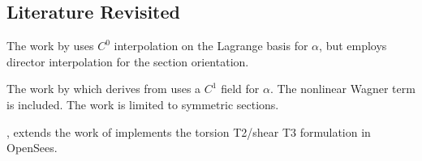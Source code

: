 \subsection{Literature Revisited}

The work by \cite{gruttmann2000theory} uses \(C^0\) interpolation on the Lagrange basis for \(\alpha\), but employs director interpolation for the section orientation.

\cite{hsiao1999consistent,hsiao2000corotational}

The work by \cite{zhang2011formulation} which derives from \cite{alemdar2001distributed} uses a \(C^1\) field for \(\alpha\). The nonlinear Wagner term is included. The work is limited to symmetric sections.

\cite{rinchen2016formulation}, \cite{rinchen2020geometric} extends the work of \cite{zhang2011formulation} implements the torsion T2/shear T3 formulation in OpenSees. 

